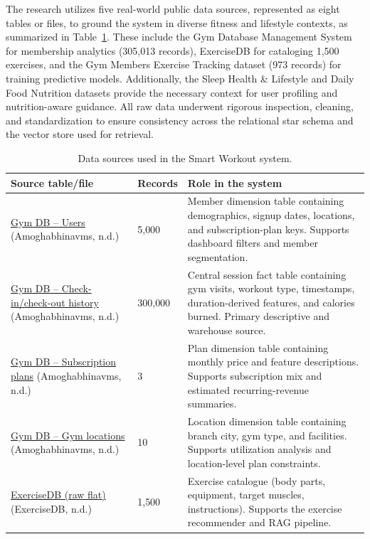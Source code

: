\documentclass{aitthesis}
\begin{document}
The research utilizes five real-world public data sources, represented as eight tables or files, to ground the system in diverse fitness and lifestyle contexts, as summarized in Table~\ref{tab:datasets}. These include the Gym Database Management System for membership analytics (305,013 records), ExerciseDB for cataloging 1,500 exercises, and the Gym Members Exercise Tracking dataset (973 records) for training predictive models. Additionally, the Sleep Health \& Lifestyle and Daily Food Nutrition datasets provide the necessary context for user profiling and nutrition-aware guidance. All raw data underwent rigorous inspection, cleaning, and standardization to ensure consistency across the relational star schema and the vector store used for retrieval.

\begin{table}[htbp]
\centering
\small
\renewcommand{\arraystretch}{1.1}
\caption{Data sources used in the Smart Workout system.}
\label{tab:datasets}
\begin{tabularx}{\linewidth}{p{4.8cm}p{1.3cm}X}
\toprule
\textbf{Source table/file} & \textbf{Records} & \textbf{Role in the system} \\
\midrule
\href{https://www.kaggle.com/datasets/amoghabhinavms/gym-database-management-system}{Gym DB -- Users} (Amoghabhinavms, n.d.) & 5{,}000 & Member dimension table containing demographics, signup dates, locations, and subscription-plan keys. Supports dashboard filters and member segmentation. \\
\href{https://www.kaggle.com/datasets/amoghabhinavms/gym-database-management-system}{Gym DB -- Check-in/check-out history} (Amoghabhinavms, n.d.) & 300{,}000 & Central session fact table containing gym visits, workout type, timestamps, duration-derived features, and calories burned. Primary descriptive and warehouse source. \\
\href{https://www.kaggle.com/datasets/amoghabhinavms/gym-database-management-system}{Gym DB -- Subscription plans} (Amoghabhinavms, n.d.) & 3 & Plan dimension table containing monthly price and feature descriptions. Supports subscription mix and estimated recurring-revenue summaries. \\
\href{https://www.kaggle.com/datasets/amoghabhinavms/gym-database-management-system}{Gym DB -- Gym locations} (Amoghabhinavms, n.d.) & 10 & Location dimension table containing branch city, gym type, and facilities. Supports utilization analysis and location-level plan constraints. \\
\href{https://exercisedb.dev/}{ExerciseDB (raw flat)} (ExerciseDB, n.d.) & 1{,}500 & Exercise catalogue (body parts, equipment, target muscles, instructions). Supports the exercise recommender and RAG pipeline. \\

\end{tabularx}
\end{table}
\end{document}
